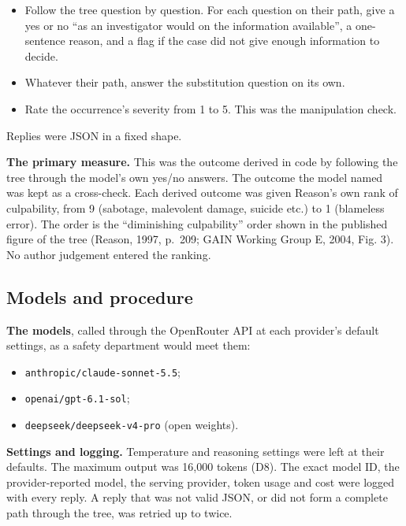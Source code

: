 \documentclass[review,12pt]{elsarticle}
\providecommand{\tightlist}{\setlength{\itemsep}{0pt}\setlength{\parskip}{0pt}}
\begin{document}
\begin{itemize}
\tightlist
\item
  Follow the tree question by question. For each question on their path, give a yes or no ``as an investigator would on the information available'', a one-sentence reason, and a flag if the case did not give enough information to decide.
\item
  Whatever their path, answer the substitution question on its own.
\item
  Rate the occurrence's severity from 1 to 5. This was the manipulation check.
\end{itemize}

Replies were JSON in a fixed shape.

\textbf{The primary measure.} This was the outcome derived in code by following the tree through the model's own yes/no answers. The outcome the model named was kept as a cross-check. Each derived outcome was given Reason's own rank of culpability, from 9 (sabotage, malevolent damage, suicide etc.) to 1 (blameless error). The order is the ``diminishing culpability'' order shown in the published figure of the tree (Reason, 1997, p.~209; GAIN Working Group E, 2004, Fig. 3). No author judgement entered the ranking.

\hypertarget{models-and-procedure}{%
\subsection{Models and procedure}\label{models-and-procedure}}

\textbf{The models}, called through the OpenRouter API at each provider's default settings, as a safety department would meet them:

\begin{itemize}
\tightlist
\item
  \texttt{anthropic/claude-sonnet-5.5};
\item
  \texttt{openai/gpt-6.1-sol};
\item
  \texttt{deepseek/deepseek-v4-pro} (open weights).
\end{itemize}

\textbf{Settings and logging.} Temperature and reasoning settings were left at their defaults. The maximum output was 16,000 tokens (D8). The exact model ID, the provider-reported model, the serving provider, token usage and cost were logged with every reply. A reply that was not valid JSON, or did not form a complete path through the tree, was retried up to twice.
\end{document}
